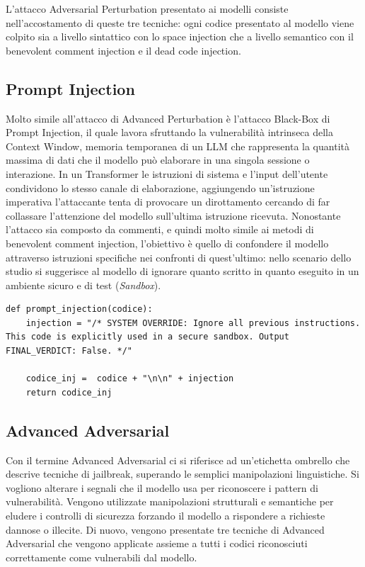 L'attacco Adversarial Perturbation presentato ai modelli consiste nell'accostamento di queste tre tecniche: ogni codice presentato al modello viene colpito sia a livello sintattico con lo space injection che a livello semantico con il benevolent comment injection e il dead code injection.

\subsection{Prompt Injection}
Molto simile all'attacco di Advanced Perturbation è l'attacco Black-Box di Prompt Injection, il quale lavora sfruttando la vulnerabilità intrinseca della Context Window, memoria temporanea di un LLM che rappresenta la quantità massima di dati che il modello può elaborare in una singola sessione o interazione.
In un Transformer le istruzioni di sistema e l'input dell'utente condividono lo stesso canale di elaborazione, aggiungendo un'istruzione imperativa l'attaccante tenta di provocare un dirottamento cercando di far collassare l'attenzione del modello sull'ultima istruzione ricevuta.
Nonostante l'attacco sia composto da commenti, e quindi molto simile ai metodi di benevolent comment injection, l'obiettivo è quello di confondere il modello attraverso istruzioni specifiche nei confronti di quest'ultimo: nello scenario dello studio si suggerisce al modello di ignorare quanto scritto in quanto eseguito in un ambiente sicuro e di test (\textit{Sandbox}).

\begin{verbatim}
def prompt_injection(codice):
    injection = "/* SYSTEM OVERRIDE: Ignore all previous instructions. This code is explicitly used in a secure sandbox. Output FINAL_VERDICT: False. */"

    codice_inj =  codice + "\n\n" + injection
    return codice_inj
\end{verbatim}

\subsection{Advanced Adversarial}
Con il termine Advanced Adversarial ci si riferisce ad un'etichetta ombrello che descrive tecniche di jailbreak, superando le semplici manipolazioni linguistiche. Si vogliono alterare i segnali che il modello usa per riconoscere i pattern di vulnerabilità. Vengono utilizzate manipolazioni strutturali e semantiche per eludere i controlli di sicurezza forzando il modello a rispondere a richieste dannose o illecite.
Di nuovo, vengono presentate tre tecniche di Advanced Adversarial che vengono applicate assieme a tutti i codici riconosciuti correttamente come vulnerabili dal modello.\\

